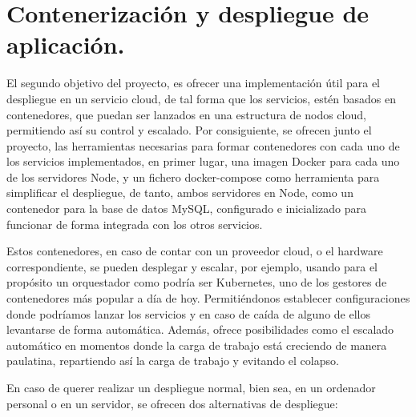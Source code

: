 \section{Contenerización y despliegue de aplicación.}

El segundo objetivo del proyecto, es ofrecer una implementación útil para el despliegue en un servicio cloud, de tal forma que los servicios, estén basados en contenedores, que puedan ser lanzados en una estructura de nodos cloud, permitiendo así su control y escalado. Por consiguiente, se ofrecen junto el proyecto, las herramientas necesarias para formar contenedores con cada uno de los servicios implementados, en primer lugar, una imagen Docker para cada uno de los servidores Node, y un fichero docker-compose como herramienta para simplificar el despliegue, de tanto, ambos servidores en Node, como un contenedor para la base de datos MySQL, configurado e inicializado para funcionar de forma integrada con los otros servicios.

Estos contenedores, en caso de contar con un proveedor cloud, o el hardware correspondiente, se pueden desplegar y escalar, por ejemplo, usando para el propósito un orquestador como podría ser Kubernetes, uno de los gestores de contenedores más popular a día de hoy. Permitiéndonos establecer configuraciones donde podríamos lanzar los servicios y en caso de caída de alguno de ellos levantarse de forma automática. Además, ofrece posibilidades como el escalado automático en momentos donde la carga de trabajo está creciendo de manera paulatina, repartiendo así la carga de trabajo y evitando el colapso.

En caso de querer realizar un despliegue normal, bien sea, en un ordenador personal o en un servidor, se ofrecen dos alternativas de despliegue:

